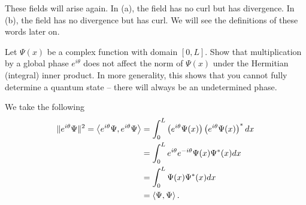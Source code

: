 \documentclass[12pt]{article} %
\begin{document}
\begin{solution}
		These fields will arise again. In (a), the field has no curl but has divergence. In (b), the field has no divergence but has curl. We will see the definitions of these words later on.
\end{solution}

\newpage
\begin{problem}
	Let $\Psi(x)$ be a complex function with domain $[0,L]$.  Show that multiplication by a global phase $e^{i\theta}$ does not affect the norm of $\Psi(x)$ under the Hermitian (integral) inner product. In more generality, this shows that you cannot fully determine a quantum state -- there will always be an undetermined phase.
\end{problem}
\begin{solution}
	We take the following
	\begin{align*}
		\|e^{i\theta} \Psi\|^2=\left\langle e^{i\theta}\Psi, e^{i\theta}\Psi \right\rangle &= \int_0^L \left(e^{i\theta}\Psi(x)\right)\left(e^{i\theta}\Psi(x)\right)^*dx\\
		&= \int_0^L e^{i\theta}e^{-i\theta} \Psi(x)\Psi^*(x)dx\\
		&= \int_0^L \Psi(x)\Psi^*(x)dx\\
		&= \left\langle \Psi, \Psi \right\rangle.
	\end{align*}
\end{solution}
\end{document}
